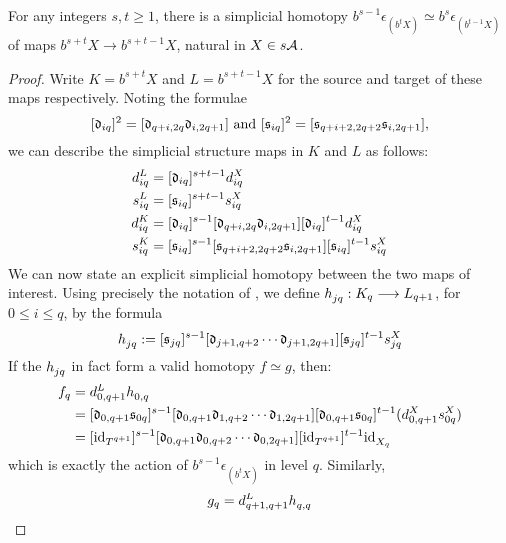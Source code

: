 \documentclass[10pt]{article}
\newcommand{\algCat}{\calA}
\newcommand{\trip}[3]{{#1}_{\smash{#2}}^{\smash{#3}}}
\begin{document}
\begin{iteratedBarConstructions}
\begin{prop}\label{IteratedBarConstructionHomotopy}
For any integers $s,t\geq1$, there is a simplicial homotopy $b^{s-1}\epsilon_{(b^{t}X)}\simeq b^{s}\epsilon_{(b^{t-1}X)}$ of maps $b^{s+t}X\to b^{s+t-1}X$, natural in $X\in s\algCat$.
\end{prop}
\begin{proof}
Write $K=b^{s+t}X$ and $L=b^{s+t-1}X$ for the source and target of these maps respectively. Noting the formulae
\[[\mathfrak{d}_{iq}]^2=[\mathfrak{d}_{q+i,2q}\relax\mathfrak{d}_{i,2q+1}]\ \textup{and}\  [\mathfrak{s}_{iq}]^2=[\mathfrak{s}_{q+i+2,2q+2}\relax\mathfrak{s}_{i,2q+1}],\]
we can describe the simplicial structure maps in $K$ and $L$ as follows:
\begin{alignat*}{2}
\trip{d}{iq}{L}&=[\frakd_{iq}]^{s+t-1}\trip{d}{iq}{X}\\
\trip{s}{iq}{L}&=[\fraks_{iq}]^{s+t-1}\trip{s}{iq}{X}\\
\trip{d}{iq}{K}&=[\frakd_{iq}]^{s-1}[\frakd_{q+i,2q}\circ\frakd_{i,2q+1}][\frakd_{iq}]^{t-1}\trip{d}{iq}{X}\\
\trip{s}{iq}{K}&=[\fraks_{iq}]^{s-1}[\fraks_{q+i+2,2q+2}\circ\fraks_{i,2q+1}][\fraks_{iq}]^{t-1}\trip{s}{iq}{X}
\end{alignat*}
We can now state an explicit simplicial homotopy between the two maps of interest. Using precisely the notation of \cite[\S5]{MaySimpObj.pdf}, we define $\trip{h}{jq}{}:K_q\to L_{q+1}$, for $0\leq i\leq q$, by the formula
\[\trip{h}{jq}{}:=[\fraks_{jq}]^{s-1}[\frakd_{j+1,q+2}\circ\cdots \circ\frakd_{j+1,2q+1}][\fraks_{jq}]^{t-1}\trip{s}{jq}{X}\]
If the $\trip{h}{jq}{}$ in fact form a valid homotopy $f\simeq g$, then: %
\begin{alignat*}{2}
f_q&=\trip{d}{0,q+1}{L}\trip{h}{0,q}{}\\
&=
[\frakd_{0,q+1}\fraks_{0q}]^{s-1}[\frakd_{0,q+1}\frakd_{1,q+2}\circ\cdots \circ\frakd_{1,2q+1}][\frakd_{0,q+1}\fraks_{0q}]^{t-1}(\trip{d}{0,q+1}{X}\trip{s}{0q}{X})%
\\
&=
[\trip{\textup{id}}{T^{q+1}}{}]^{s-1}[\frakd_{0,q+1}\frakd_{0,q+2}\circ\cdots \circ\frakd_{0,2q+1}][\trip{\textup{id}}{T^{q+1}}{}]^{t-1}\trip{\textup{id}}{X_q}{}%
\end{alignat*}
which is exactly the action of  $b^{s-1}\epsilon_{(b^{t}X)}$ in level $q$. Similarly,
\begin{alignat*}{2}
g_q&=\trip{d}{q+1,q+1}{L}\trip{h}{q,q}{}\\

\end{alignat*}
\end{proof}
\end{iteratedBarConstructions}
\end{document}
